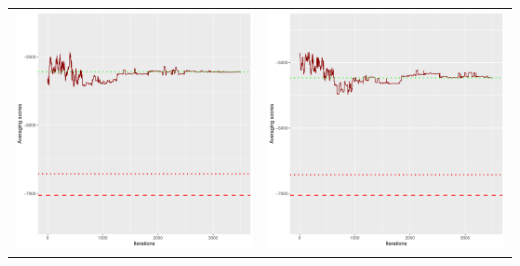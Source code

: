 \documentclass[]{scrartcl}
\begin{document}
\begin{table}[h!]
\begin{tabular}{cc}
\includegraphics[scale = 0.4]{./figs/alarm/v3/30/avgBoundsEvolution-3502.pdf} & 
\includegraphics[scale = 0.4]{./figs/alarm/v3/50/avgBoundsEvolution-3502.pdf} \\

\end{tabular}
\end{table}
\end{document}

